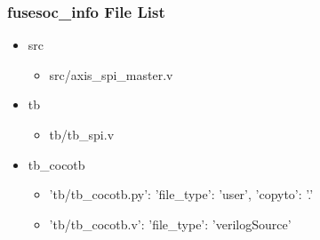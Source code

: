 \subsubsection{fusesoc\_info File List}
\begin{itemize}
\item src
	\begin{itemize}
	\item src/axis\_spi\_master.v
	\end{itemize}
\item tb
	\begin{itemize}
	\item tb/tb\_spi.v
	\end{itemize}
\item tb\_cocotb
	\begin{itemize}
	\item {'tb/tb\_cocotb.py': {'file\_type': 'user', 'copyto': '.'}}
	\item {'tb/tb\_cocotb.v': {'file\_type': 'verilogSource'}}
	\end{itemize}
\end{itemize}
